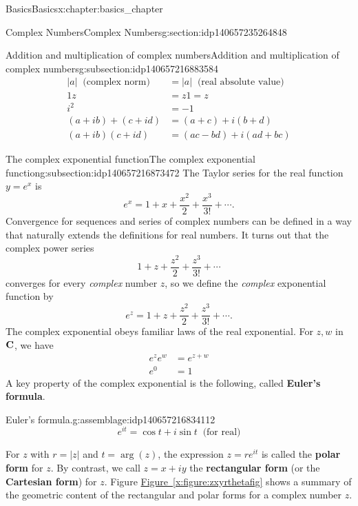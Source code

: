 \documentclass[oneside,10pt,]{book}
\newcommand{\terminology}[1]{\textbf{#1}}
\numberwithin{equation}{section}
\newcommand{\C}{{\rm \bf C}}
\newcommand{\amp}{&}
\begin{document}
\begin{chapterptx}{Basics}{}{Basics}{}{}{x:chapter:basics_chapter}
\begin{sectionptx}{Complex Numbers}{}{Complex Numbers}{}{}{g:section:idp140657235264848}
\begin{subsectionptx}{Addition and multiplication of complex numbers}{}{Addition and multiplication of complex numbers}{}{}{g:subsection:idp140657216883584}
\begin{align}
|a| \;\;\text{(complex norm)} \amp = |a| \;\;\text{(real absolute value)}\label{x:mrow:normextends}\\
1z \amp = z1 = z \label{x:mrow:multidentity}\\
i^2 \amp = -1\label{x:mrow:i2isminus1}\\
(a+ib)+ (c+id) \amp = (a+c) + i(b+d)\label{g:mrow:idp140657216871792}\\
(a+ib)(c+id) \amp = (ac-bd) + i(ad+bc)\label{x:mrow:complexmultrectangular}
\end{align}
%
\end{subsectionptx}
%
%
\typeout{************************************************}
\typeout{************************************************}
%
\begin{subsectionptx}{The complex exponential function}{}{The complex exponential function}{}{}{g:subsection:idp140657216873472}
The Taylor series for the real function \(y=e^x\) is%
\begin{equation*}
e^x = 1 +x +\frac{x^2}{2} +\frac{x^3}{3!} + \cdots .
\end{equation*}
Convergence for sequences and series of complex numbers can be defined in a way that naturally extends the definitions for real numbers. It turns out that the complex power series%
\begin{equation*}
1 +z +\frac{z^2}{2} +\frac{z^3}{3!} + \cdots 
\end{equation*}
converges for every \emph{complex} number \(z\), so we define the \emph{complex} exponential function by%
\begin{equation*}
e^z= 1 +z +\frac{z^2}{2} +\frac{z^3}{3!} + \cdots .
\end{equation*}
The complex exponential obeys familiar laws of the real exponential. For \(z,w\) in \(\C\), we have%
\begin{align*}
e^ze^w \amp = e^{z+w}\\
e^0 \amp =1
\end{align*}
A key property of the complex exponential is the following, called \terminology{Euler's formula}.%
\begin{assemblage}{Euler's formula.}{g:assemblage:idp140657216834112}%
%
\begin{equation}
e^{it}= \cos t + i\sin t \;\;\text{(for  real)}\label{x:men:eulersformula}
\end{equation}
%
\end{assemblage}
For \(z\) with \(r=|z|\) and \(t=\arg(z)\), the expression \(z=re^{it}\) is called the \terminology{polar form} for \(z\). By contrast, we call \(z=x+iy\) the \terminology{rectangular form} (or the \terminology{Cartesian form}) for \(z\). Figure \hyperref[x:figure:zxyrthetafig]{Figure~\ref{x:figure:zxyrthetafig}} shows a summary of the geometric content of the rectangular and polar forms for a complex number \(z\).%

\end{subsectionptx}
\end{sectionptx}
\end{chapterptx}
\end{document}
